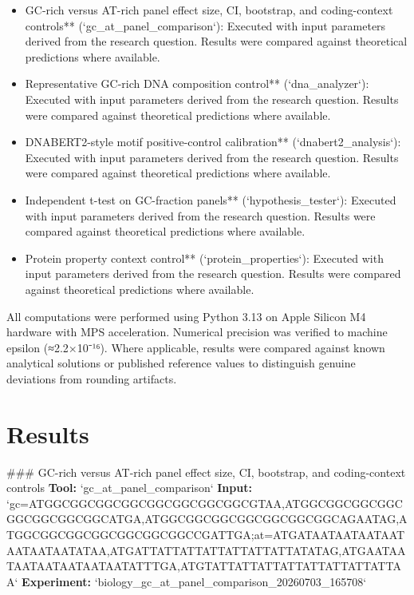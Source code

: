 \documentclass[11pt,a4paper]{article}
\begin{document}
\begin{itemize}
\item GC-rich versus AT-rich panel effect size, CI, bootstrap, and coding-context controls** (`gc\_at\_panel\_comparison`): Executed with input parameters derived from the research question. Results were compared against theoretical predictions where available.
\item Representative GC-rich DNA composition control** (`dna\_analyzer`): Executed with input parameters derived from the research question. Results were compared against theoretical predictions where available.
\item DNABERT2-style motif positive-control calibration** (`dnabert2\_analysis`): Executed with input parameters derived from the research question. Results were compared against theoretical predictions where available.
\item Independent t-test on GC-fraction panels** (`hypothesis\_tester`): Executed with input parameters derived from the research question. Results were compared against theoretical predictions where available.
\item Protein property context control** (`protein\_properties`): Executed with input parameters derived from the research question. Results were compared against theoretical predictions where available.
\end{itemize}
All computations were performed using Python 3.13 on Apple Silicon M4 hardware with MPS acceleration. Numerical precision was verified to machine epsilon (≈2.2×10⁻¹⁶). Where applicable, results were compared against known analytical solutions or published reference values to distinguish genuine deviations from rounding artifacts.


\section{Results}
\#\#\# GC-rich versus AT-rich panel effect size, CI, bootstrap, and coding-context controls
\textbf{Tool:} `gc\_at\_panel\_comparison`
\textbf{Input:} `gc=ATGGCGGCGGCGGCGGCGGCGGCGGCGTAA,ATGGCGGCGGCGGCGGCGGCGGCGGCATGA,ATGGCGGCGGCGGCGGCGGCGGCAGAATAG,ATGGCGGCGGCGGCGGCGGCGGCCGATTGA;at=ATGATAATAATAATAATAATAATAATATAA,ATGATTATTATTATTATTATTATTATATAG,ATGAATAATAATAATAATAATAATATTTGA,ATGTATTATTATTATTATTATTATTATTAA`
\textbf{Experiment:} `biology\_gc\_at\_panel\_comparison\_20260703\_165708`
\end{document}
